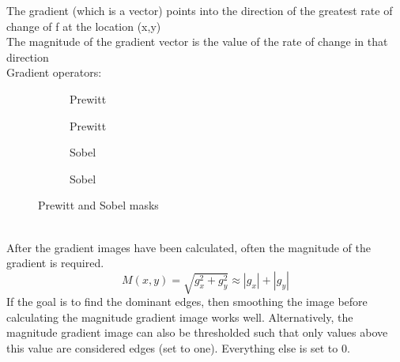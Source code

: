 The gradient (which is a vector) points into the direction of the greatest rate of change of f at the location (x,y)\\
The magnitude of the gradient vector is the value of the rate of change in that direction\\
Gradient operators:\\
\begin{figure}[h]
	\centering
	\begin{subfigure}[b]{0.2\textwidth}
		\centering
		\caption{Prewitt}
	\end{subfigure}
	\begin{subfigure}[b]{0.2\textwidth}
		\centering
		\caption{Prewitt}
	\end{subfigure}
	\begin{subfigure}[b]{0.2\textwidth}
		\centering
		\caption{Sobel}
	\end{subfigure}
	\begin{subfigure}[b]{0.2\textwidth}
		\centering
		\caption{Sobel}
	\end{subfigure}
	\caption{Prewitt and Sobel masks}
\end{figure}\\
After the gradient images have been calculated, often the magnitude of the gradient is required.
\[
	M(x,y) = \sqrt{g_x^2 + g_y^2} \approx |g_x|+|g_y|
\]
If the goal is to find the dominant edges, then smoothing the image before calculating the magnitude gradient image works well. Alternatively, the magnitude gradient image can also be thresholded such that only values above this value are considered edges (set to one). Everything else is set to 0.
